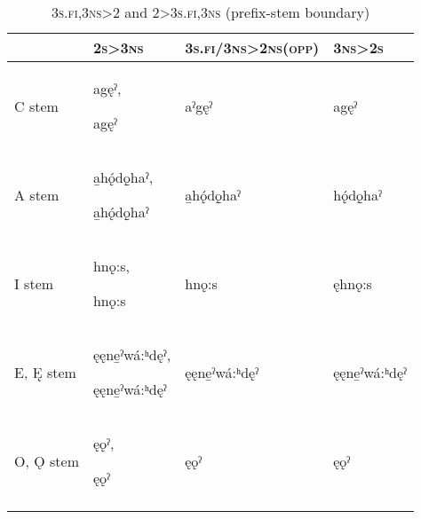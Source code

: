 \begin{table}
\caption{\textsc{3s.fi,3ns>2} and \textsc{2>3s.fi,3ns} (prefix-stem boundary)}
\label{figtab:you.they.end}
{
\begin{tabularx}{\textwidth}{lp{32mm}QQ}
\lsptoprule
&\textsc{2s>3ns}&\textsc{3s.fi/3ns>2ns(opp)}& \textsc{3ns>2s}\\
\midrule 
C stem&

agęˀ, 

agęˀ&

aˀgęˀ& 

agęˀ\\
\tablevspace
A stem&

\-a̱hǫ́dǫ̱haˀ, 

\-a̱hǫ́dǫ̱haˀ&

\-a̱hǫ́dǫ̱haˀ & 

\-hǫ́dǫ̱haˀ\\
\tablevspace
I stem&

hnǫ:s, 

hnǫ:s&

hnǫ:s & 

ęhnǫ:s\\
\tablevspace
E, Ę stem&

ęęne̱ˀ\-wá:ʰdęˀ, 

ęęne̱ˀ\-wá:ʰdęˀ&

ęęne̱ˀ\-wá:ʰdęˀ & 

ęęne̱ˀ\-wá:ʰdęˀ\\
\tablevspace
O, Ǫ stem&

ęǫˀ, 

ęǫˀ&

ęǫˀ & 

ęǫˀ\\

\lspbottomrule
\end{tabularx}}
\end{table}





